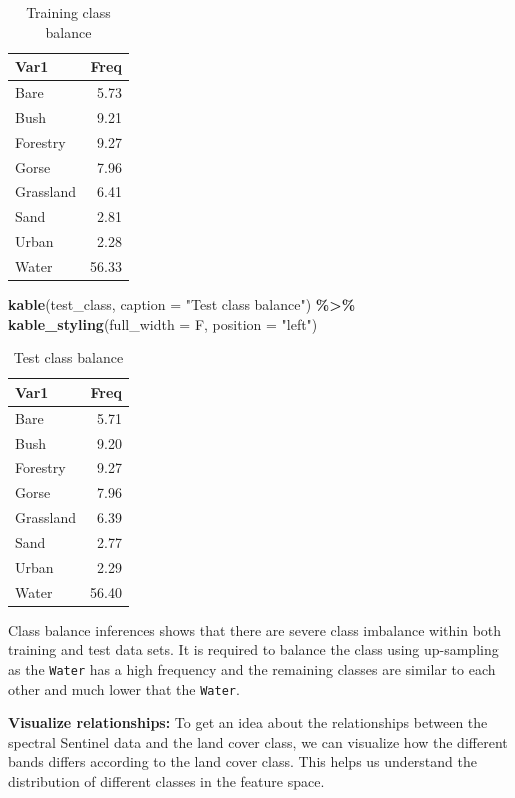 \documentclass[
]{article}
\newenvironment{Shaded}{\begin{snugshade}}{\end{snugshade}}
\newcommand{\AttributeTok}[1]{\textcolor[rgb]{0.13,0.29,0.53}{#1}}
\newcommand{\FunctionTok}[1]{\textcolor[rgb]{0.13,0.29,0.53}{\textbf{#1}}}
\newcommand{\NormalTok}[1]{#1}
\newcommand{\SpecialCharTok}[1]{\textcolor[rgb]{0.81,0.36,0.00}{\textbf{#1}}}
\newcommand{\StringTok}[1]{\textcolor[rgb]{0.31,0.60,0.02}{#1}}
\begin{document}
\begin{longtable}[l]{lr}
\caption{\label{tab:split}Training class balance}\\
\toprule
Var1 & Freq\\
\midrule
Bare & 5.73\\
Bush & 9.21\\
Forestry & 9.27\\
Gorse & 7.96\\
Grassland & 6.41\\
\addlinespace
Sand & 2.81\\
Urban & 2.28\\
Water & 56.33\\
\bottomrule
\end{longtable}

\begin{Shaded}
\begin{Highlighting}[]
\FunctionTok{kable}\NormalTok{(test\_class, }\AttributeTok{caption =} \StringTok{"Test class balance"}\NormalTok{) }\SpecialCharTok{\%\textgreater{}\%}
  \FunctionTok{kable\_styling}\NormalTok{(}\AttributeTok{full\_width =}\NormalTok{ F, }\AttributeTok{position =} \StringTok{"left"}\NormalTok{)}
\end{Highlighting}
\end{Shaded}

\begin{longtable}[l]{lr}
\caption{\label{tab:split}Test class balance}\\
\toprule
Var1 & Freq\\
\midrule
Bare & 5.71\\
Bush & 9.20\\
Forestry & 9.27\\
Gorse & 7.96\\
Grassland & 6.39\\
\addlinespace
Sand & 2.77\\
Urban & 2.29\\
Water & 56.40\\
\bottomrule
\end{longtable}

Class balance inferences shows that there are severe class imbalance
within both training and test data sets. It is required to balance the
class using up-sampling as the \texttt{Water} has a high frequency and
the remaining classes are similar to each other and much lower that the
\texttt{Water}.

\textbf{Visualize relationships:} To get an idea about the relationships
between the spectral Sentinel data and the land cover class, we can
visualize how the different bands differs according to the land cover
class. This helps us understand the distribution of different classes in
the feature space.
\end{document}
